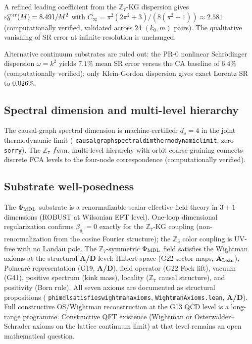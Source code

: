 \documentclass[11pt]{article}
\theoremstyle{remark}
\newcommand{\ZS}{\mathbb{Z}_7}
\newcommand{\Zthree}{\mathbb{Z}_3}
\newcommand{\fmdl}{f_{\rm MDL}}
\newcommand{\lean}[1]{%
  \penalty-100
  \begingroup\def\_{\textunderscore\allowbreak}\texttt{#1}\endgroup}
\newcommand{\phimdl}{\Phi_{\rm MDL}}
\newcommand{\epszero}{\varepsilon_0}
\newcommand{\CatAL}{\ensuremath{\textbf{A}_{\rm Lean}}}
\newcommand{\CatAD}{\textbf{A/D}}
\begin{document}
A refined leading coefficient from the $\ZS$-KG dispersion gives
$\epszero^{\rm corr}(M) = 8.491/M^2$ with
$C_\infty = \pi^2(2\pi^2 + 3)/(8(\pi^2 + 1)) \approx 2.581$ (computationally verified, validated across
24 $(k_0, m)$ pairs).
The qualitative vanishing of SR error at infinite resolution is unchanged.

Alternative continuum substrates are ruled out: the PR-0 nonlinear Schr\"odinger
dispersion $\omega = k^2$ yields $7.1\%$ mean SR error versus the CA baseline of
$6.4\%$ (computationally verified); only Klein-Gordon dispersion gives exact Lorentz SR to $0.026\%$.

\subsection{Spectral dimension and multi-level hierarchy}

The causal-graph spectral dimension is machine-certified:
$d_s = 4$ in the joint thermodynamic limit
(\lean{causal\_graph\_spectral\_dim\_thermodynamic\_limit}, zero \texttt{sorry}).
The $\ZS$ $\fmdl$ multi-level hierarchy with orbit coarse-graining connects discrete
FCA levels to the four-node correspondence (computationally verified).

\subsection{Substrate well-posedness}

The $\phimdl$ substrate is a renormalizable scalar effective field theory in $3+1$
dimensions (ROBUST at Wilsonian EFT level).
One-loop dimensional regularization confirms $\beta_{g_1} = 0$ exactly for the
$\ZS$-KG coupling (non-renormalization from the cosine Fourier structure); the
$\Zthree$ color coupling is UV-free with no Landau pole.
The $\ZS$-symmetric $\phimdl$ field satisfies the Wightman axioms at the structural
\CatAD{} level: Hilbert space (G22 sector maps, \CatAL{}), Poincar\'{e} representation
(G19, \CatAD{}), field operator (G22 Fock lift), vacuum (G41), positive spectrum
(kink mass), locality ($\ZS$ causal structure), and positivity (Born rule).
All seven axioms are documented as structural propositions
(\lean{phimdl\_satisfies\_wightman\_axioms}, \texttt{WightmanAxioms.lean}, \CatAD{}).
Full constructive OS/Wightman reconstruction at the G13 QCD level is a long-range
programme.
Constructive QFT existence (Wightman or Osterwalder--Schrader axioms on the lattice
continuum limit) at that level remains an open mathematical question.
\end{document}
